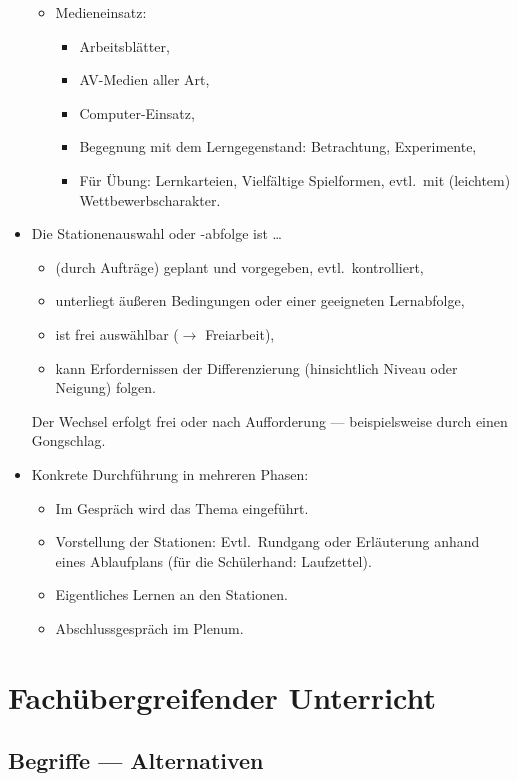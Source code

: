 \begin{itemize}
\begin{itemize}
\item Medieneinsatz:
\begin{itemize}
\item Arbeitsbl\"{a}tter,
\item AV-Medien aller Art,
\item Computer-Einsatz,
\item Begegnung mit dem Lerngegenstand: Betrachtung, Experimente,
\item F\"{u}r \"{U}bung: Lernkarteien, Vielf\"{a}ltige Spielformen, evtl.\ mit (leichtem) Wettbewerbscharakter.
\end{itemize}
\end{itemize}

\item Die Stationenauswahl oder -abfolge ist \dots
\begin{itemize}
\item (durch Auftr\"{a}ge) geplant und vorgegeben, evtl.\ kontrolliert,
\item unterliegt \"{a}u{\ss}eren Bedingungen oder einer geeigneten Lernabfolge,
\item ist frei ausw\"{a}hlbar ($\to$ Freiarbeit),
\item kann Erfordernissen der Differenzierung (hinsichtlich Niveau oder Neigung) folgen.
\end{itemize}

Der Wechsel erfolgt frei oder nach Aufforderung --- beispielsweise durch einen Gongschlag.
\item
Konkrete Durchf\"{u}hrung in mehreren Phasen:
\begin{itemize}
\item Im Gespr\"{a}ch wird das Thema eingef\"{u}hrt.
\item Vorstellung der Stationen: Evtl.\ Rundgang oder Erl\"{a}uterung anhand eines Ablaufplans
(f\"{u}r die Sch\"{u}lerhand: Laufzettel).
\item Eigentliches Lernen an den Stationen.
\item Abschlussgespr\"{a}ch im Plenum.

\end{itemize}

\end{itemize}

\bip\bip
\section{Fach\"{u}bergreifender Unterricht}
\subsection{Begriffe --- Alternativen}

